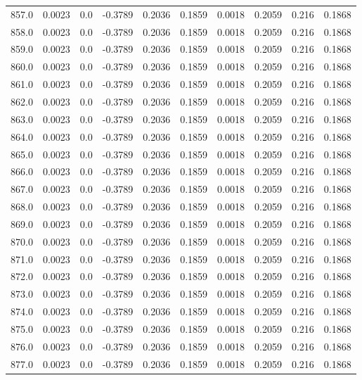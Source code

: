 \begin{longtable}{lrrrrrrrrr}
857.0 & 0.0023 & 0.0 & -0.3789 & 0.2036 & 0.1859 & 0.0018 & 0.2059 & 0.216 & 0.1868 \\
858.0 & 0.0023 & 0.0 & -0.3789 & 0.2036 & 0.1859 & 0.0018 & 0.2059 & 0.216 & 0.1868 \\
859.0 & 0.0023 & 0.0 & -0.3789 & 0.2036 & 0.1859 & 0.0018 & 0.2059 & 0.216 & 0.1868 \\
860.0 & 0.0023 & 0.0 & -0.3789 & 0.2036 & 0.1859 & 0.0018 & 0.2059 & 0.216 & 0.1868 \\
861.0 & 0.0023 & 0.0 & -0.3789 & 0.2036 & 0.1859 & 0.0018 & 0.2059 & 0.216 & 0.1868 \\
862.0 & 0.0023 & 0.0 & -0.3789 & 0.2036 & 0.1859 & 0.0018 & 0.2059 & 0.216 & 0.1868 \\
863.0 & 0.0023 & 0.0 & -0.3789 & 0.2036 & 0.1859 & 0.0018 & 0.2059 & 0.216 & 0.1868 \\
864.0 & 0.0023 & 0.0 & -0.3789 & 0.2036 & 0.1859 & 0.0018 & 0.2059 & 0.216 & 0.1868 \\
865.0 & 0.0023 & 0.0 & -0.3789 & 0.2036 & 0.1859 & 0.0018 & 0.2059 & 0.216 & 0.1868 \\
866.0 & 0.0023 & 0.0 & -0.3789 & 0.2036 & 0.1859 & 0.0018 & 0.2059 & 0.216 & 0.1868 \\
867.0 & 0.0023 & 0.0 & -0.3789 & 0.2036 & 0.1859 & 0.0018 & 0.2059 & 0.216 & 0.1868 \\
868.0 & 0.0023 & 0.0 & -0.3789 & 0.2036 & 0.1859 & 0.0018 & 0.2059 & 0.216 & 0.1868 \\
869.0 & 0.0023 & 0.0 & -0.3789 & 0.2036 & 0.1859 & 0.0018 & 0.2059 & 0.216 & 0.1868 \\
870.0 & 0.0023 & 0.0 & -0.3789 & 0.2036 & 0.1859 & 0.0018 & 0.2059 & 0.216 & 0.1868 \\
871.0 & 0.0023 & 0.0 & -0.3789 & 0.2036 & 0.1859 & 0.0018 & 0.2059 & 0.216 & 0.1868 \\
872.0 & 0.0023 & 0.0 & -0.3789 & 0.2036 & 0.1859 & 0.0018 & 0.2059 & 0.216 & 0.1868 \\
873.0 & 0.0023 & 0.0 & -0.3789 & 0.2036 & 0.1859 & 0.0018 & 0.2059 & 0.216 & 0.1868 \\
874.0 & 0.0023 & 0.0 & -0.3789 & 0.2036 & 0.1859 & 0.0018 & 0.2059 & 0.216 & 0.1868 \\
875.0 & 0.0023 & 0.0 & -0.3789 & 0.2036 & 0.1859 & 0.0018 & 0.2059 & 0.216 & 0.1868 \\
876.0 & 0.0023 & 0.0 & -0.3789 & 0.2036 & 0.1859 & 0.0018 & 0.2059 & 0.216 & 0.1868 \\
877.0 & 0.0023 & 0.0 & -0.3789 & 0.2036 & 0.1859 & 0.0018 & 0.2059 & 0.216 & 0.1868 \\

\end{longtable}
